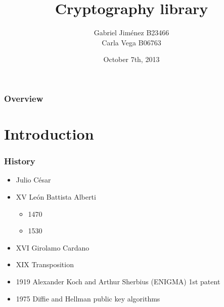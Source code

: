\documentclass{beamer}
\title[GEYKE93]{Cryptography library} %
\author{Gabriel Jiménez B23466 \\ Carla Vega B06763} %
\institute[UCR] %
{
University of Costa Rica \\ %
\medskip
\textit{}
}
\date{October 7th, 2013} %
\begin{document}
\begin{frame}
\titlepage {} %
\end{frame}

\begin{frame}
\frametitle{Overview} %
\tableofcontents %
\end{frame}


\section{Introduction}
\begin{frame}
\frametitle{History}
\begin{itemize}
\item Julio César
\item XV León Battista Alberti 
\begin{itemize}
\item 1470 
\item 1530 
\end{itemize}
\item XVI Girolamo Cardano
\item XIX Transposition
\item 1919 Alexander Koch and Arthur Sherbius (ENIGMA) 1st patent
\item 1975 Diffie and Hellman public key algorithms
\end{itemize}
\end{frame}
\end{document}
